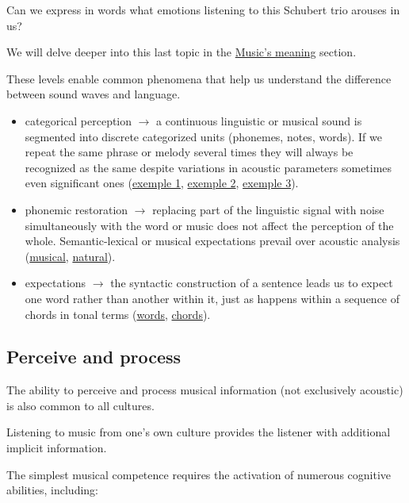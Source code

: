 Can we express in words what emotions listening to this Schubert trio arouses in us?

We will delve deeper into this last topic in the \hyperref[meaning]{Music’s meaning} section.

These levels enable common phenomena that help us understand the difference between sound waves and language.

\begin{itemize}
\tightlist
\item categorical perception \(\rightarrow\) a continuous linguistic or musical sound is segmented into discrete categorized units (phonemes, notes, words). If we repeat the same phrase or melody several times they will always be recognized as the same despite variations in acoustic parameters sometimes even significant ones (\href{http://www.musicaecodice.it/gitmedia/emc/1_media/pollini.mp3}{exemple 1}, \href{http://www.musicaecodice.it/gitmedia/emc/1_media/kissin.mp3}{exemple 2}, \href{http://www.musicaecodice.it/gitmedia/emc/1_media/sokolov.mp3}{exemple 3}).
\item phonemic restoration \(\rightarrow\) replacing part of the linguistic signal with noise simultaneously with the word or music does not affect the perception of the whole. Semantic-lexical or musical expectations prevail over acoustic analysis (\href{http://www.musicaecodice.it/gitmedia/emc/1_media/buchi.mp3}{musical},  \href{http://www.musicaecodice.it/gitmedia/emc/1_media/vian.mp3}{natural}).
\item expectations \(\rightarrow\) the syntactic construction of a sentence leads us to expect one word rather than another within it, just as happens within a sequence of chords in tonal terms (\href{http://www.musicaecodice.it/gitmedia/emc/1_media/analisi.mp3}{words}, \href{http://www.musicaecodice.it/gitmedia/emc/1_media/accordi.mp3}{chords}).
\end{itemize}

\subsection{Perceive and process }\label{perceive-and-process}

The ability to perceive and process musical information (not exclusively acoustic) is also common to all cultures.

Listening to music from one's own culture provides the listener with additional implicit information.

The simplest musical competence requires the activation of numerous cognitive abilities, including: 

